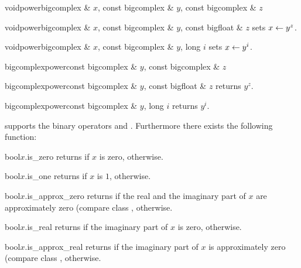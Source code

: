 \begin{fcode}{void}{power}{bigcomplex & $x$, const bigcomplex & $y$, const bigcomplex & $z$}\end{fcode}
\begin{fcode}{void}{power}{bigcomplex & $x$, const bigcomplex & $y$, const bigfloat & $z$}
  sets $x \leftarrow y^z$.
\end{fcode}

\begin{fcode}{void}{power}{bigcomplex & $x$, const bigcomplex & $y$, long $i$}
  sets $x \leftarrow y^i$.
\end{fcode}

\begin{fcode}{bigcomplex}{power}{const bigcomplex & $y$, const bigcomplex & $z$}\end{fcode}
\begin{fcode}{bigcomplex}{power}{const bigcomplex & $y$, const bigfloat & $z$}
  returns $y^z$.
\end{fcode}

\begin{fcode}{bigcomplex}{power}{const bigcomplex & $y$, long $i$}
  returns $y^i$.
\end{fcode}



\COMP

 supports the binary operators \code{==} and \code{!=}.  Furthermore there
exists the following function:

\begin{cfcode}{bool}{$x$.is_zero}{}
  returns \TRUE if $x$ is zero, \FALSE otherwise.
\end{cfcode}

\begin{cfcode}{bool}{$x$.is_one}{}
  returns \TRUE if $x$ is $1$, \FALSE otherwise.
\end{cfcode}

\begin{cfcode}{bool}{$x$.is_approx_zero}{}
  returns \TRUE if the real and the imaginary part of $x$ are approximately zero (compare class
  , \FALSE otherwise.
\end{cfcode}

\begin{cfcode}{bool}{$x$.is_real}{}
  returns \TRUE if the imaginary part of $x$ is zero, \FALSE otherwise.
\end{cfcode}

\begin{cfcode}{bool}{$x$.is_approx_real}{}
  returns \TRUE if the imaginary part of $x$ is approximately zero (compare class
  , \FALSE otherwise.
\end{cfcode}

